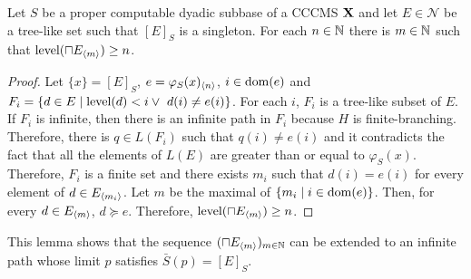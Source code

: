 \documentclass{eptcs-modified}
\begin{document}
\begin{lemma}\label{lem:sqcapsingle}
  Let $S$ be a proper computable dyadic subbase of a CCCMS $\mathbf{X}$ and
  let $E \in \mathcal{N}$ be a tree-like set such that $[E]_S$ is a singleton.
  For each $n \in \mathbb{N}$  there is $m \in \mathbb{N}$ such that $\textrm{level}(\sqcap {{E_{{\langle m\rangle}}}}) \geq n$.

  \begin{proof}
    Let $\{x\} = [E]_S$, $e = {{\varphi_S(x)_{{\langle n\rangle}}}}$, $i \in \operatorname{dom}(e)$ and $F_i = \{d \in E \mid \textrm{level}(d) < i\linebreak \lor\ d(i) \ne e(i)\}$.
    For each $i$, $F_i$ is a tree-like subset of $E$.  If $F_i$ is infinite, then  there is an infinite path in $F_i$ because $H$ is finite-branching.
    Therefore, there is $q \in L(F_i)$ such that $q(i) \ne e(i)$ and it contradicts the fact that all the elements of
$L(E)$ are greater than or equal to  $\varphi_S(x)$.
    Therefore, $F_i$ is a finite set and there exists $m_i$ such that $d(i) = e(i)$ for every element of $d \in {{E_{{\langle m_i\rangle}}}}$.   Let $m$ be the maximal of $\{m_i \mid i \in \operatorname{dom}(e)\}$.
    Then, for every  $d \in {{E_{{\langle m\rangle}}}}$, $d \succeq e$.  Therefore, $\textrm{level}(\sqcap {{E_{{\langle m\rangle}}}}) \geq n$.
  \end{proof}
\end{lemma}

This lemma shows that the sequence $(\sqcap {{E_{{\langle m\rangle}}}})_{m \in \mathbb{N}}$ can be extended to an infinite path whose limit $p$ satisfies $\bar{S}(p) = [E]_S$.
\end{document}
